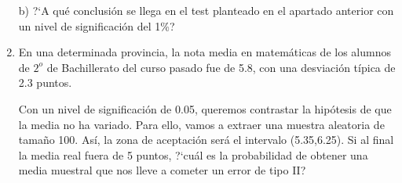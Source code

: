 \begin{adjustwidth}{20pt}{10pt}
\begin{enumerate}[PB. 1. ]
b) ?`A qué conclusión se llega en el test planteado en el apartado anterior con un nivel de significación del 1\%?

\hspace{-15mm}

\hspace{-15mm} \vspace{1cm}

\item En una determinada provincia, la nota media en matemáticas de los alumnos de $2^o$ de Bachillerato del curso pasado fue de 5.8, con una desviación típica de 2.3 puntos.

Con un nivel de significación de 0.05, queremos contrastar la hipótesis de que la media no ha variado. Para ello, vamos a extraer una muestra aleatoria de tamaño 100. Así, la zona de aceptación será el intervalo (5.35,6.25). Si al final la media real fuera de 5 puntos, ?`cuál es la probabilidad de obtener una media muestral que nos lleve a cometer un error de tipo II?

\hspace{-15mm}

\hspace{-15mm} \vspace{1cm}



\end{enumerate}
\end{adjustwidth}




	
